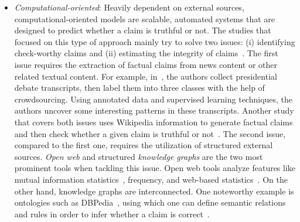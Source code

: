 \begin{description}
\begin{itemize}
              fact-checking is a collection of annotations that are afterward aggregated to obtain an overall result indicating the veracity of the
              news. Unlike professional fact-checkers, who are in short supply, this approach is scalable given that the crowd contains enough
              literate people~\parencite{ScalingUpFactChecking_Allen}.  For instance, Twitter launched a program called
              Birdwatch~\footnote{https://twitter.github.io/birdwatch/overview/}, in which the users are able to leave notes for tweets that they
              think contain misinformation. Furthermore, this tool allows users to rate each other’s notes, leading to the diversity of perspectives~\footnote{https://twitter.github.io/birdwatch/diversity-of-perspectives/}. Another example is from
              Facebook~\footnote{https://www.facebook.com/formedia/blog/third-party-fact-checking-how-it-works}, which uses a third party of
              crowdsourced fact-checkers called International Fact-Checking Network~\footnote{https://www.poynter.org/ifcn/} (IFCN).
        \item \emph{Computational-oriented}: Heavily dependent on external sources, computational-oriented models are scalable, automated
              systems that are designed to predict whether a claim is truthful or not. The studies that focused on this type of approach mainly try
              to solve two issues: (i) identifying check-worthy claims and (ii) estimating the integrity of claims~\parencite{FakeNewsDetectionOnSocialMediaADataMiningPerspective_Shu}.  The first issue requires the extraction of factual claims
              from news content or other related textual content. For example, in~\parencite{DetectingCheckWorthyClaims_Hassan}, the authors collect presidential debate transcripts, then label them into three classes with the help of crowdsourcing. Using annotated data and supervised learning techniques, the authors uncover some interesting patterns in these transcripts. Another study that covers both issues uses Wikipedia information to generate factual claims and then check whether a given claim is truthful or not~\parencite{FEVER_Thorne}.  The second issue, compared to the first one, requires the utilization of structured external sources. \emph{Open web} and structured \emph{knowledge graphs} are the two most prominent tools when tackling this issue. Open web tools analyze features like mutual information statistics~\parencite{UnsupervisedNamedEntityExtraction_Etzioni}, frequency, and web-based statistics~\parencite{WebBasedStatisticalFactChecking_Magdy}.  On the other hand, knowledge graphs are interconnected. One noteworthy example is ontologies such as DBPedia~\parencite{DBPedia_Auer}, using which one can define semantic relations and rules in order to infer whether a claim is correct~\parencite{SemanticFakeNewsDetection_Bracsoveanu}.
    \end{itemize}
\end{description}

